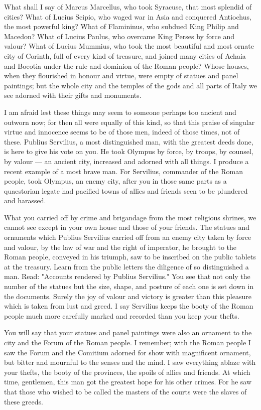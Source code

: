  What shall I say of Marcus Marcellus, who took Syracuse, that most splendid of cities? What of Lucius Scipio, who waged war in Asia and conquered Antiochus, the most powerful king? What of Flamininus, who subdued King Philip and Macedon? What of Lucius Paulus, who overcame King Perses by force and valour? What of Lucius Mummius, who took the most beautiful and most ornate city of Corinth, full of every kind of treasure, and joined many cities of Achaia and Boeotia under the rule and dominion of the Roman people? Whose houses, when they flourished in honour and virtue, were empty of statues and panel paintings; but the whole city and the temples of the gods and all parts of Italy we see adorned with their gifts and monuments.

 I am afraid lest these things may seem to someone perhaps too ancient and outworn now; for then all were equally of this kind, so that this praise of singular virtue and innocence seems to be of those men, indeed of those times, not of these. Publius Servilius, a most distinguished man, with the greatest deeds done, is here to give his vote on you. He took Olympus by force, by troops, by counsel, by valour --- an ancient city, increased and adorned with all things. I produce a recent example of a most brave man. For Servilius, commander of the Roman people, took Olympus, an enemy city, after you in those same parts as a quaestorian legate had pacified towns of allies and friends seen to be plundered and harassed.

 What you carried off by crime and brigandage from the most religious shrines, we cannot see except in your own house and those of your friends. The statues and ornaments which Publius Servilius carried off from an enemy city taken by force and valour, by the law of war and the right of imperator, he brought to the Roman people, conveyed in his triumph, saw to be inscribed on the public tablets at the treasury. Learn from the public letters the diligence of so distinguished a man. Read: "Accounts rendered by Publius Servilius." You see that not only the number of the statues but the size, shape, and posture of each one is set down in the documents. Surely the joy of valour and victory is greater than this pleasure which is taken from lust and greed. I say Servilius keeps the booty of the Roman people much more carefully marked and recorded than you keep your thefts.

 You will say that your statues and panel paintings were also an ornament to the city and the Forum of the Roman people. I remember; with the Roman people I saw the Forum and the Comitium adorned for show with magnificent ornament, but bitter and mournful to the senses and the mind. I saw everything ablaze with your thefts, the booty of the provinces, the spoils of allies and friends. At which time, gentlemen, this man got the greatest hope for his other crimes. For he saw that those who wished to be called the masters of the courts were the slaves of these greeds.

